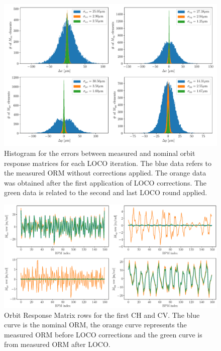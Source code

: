 \begin{figure}
\centering
\includegraphics[width=1.0\textwidth]{figures/histogram_loco_iterations.pdf}
\caption{Histogram for the errors between measured and nominal orbit response matrices for each LOCO iteration. The blue data refers to the measured ORM without corrections applied. The orange data was obtained after the first application of LOCO corrections. The green data is related to the second and last LOCO round applied.}
\label{fig:histogram}
\end{figure}

\begin{figure}
\centering
\includegraphics[width=1.0\textwidth]{figures/nominal_measured_after_before_loco.eps}
\caption{Orbit Response Matrix rows for the first CH and CV. The blue curve is the nominal ORM, the orange curve represents the measured ORM before LOCO corrections and the green curve is from measured ORM after LOCO.}
\label{fig:orm_rows}
\end{figure}

